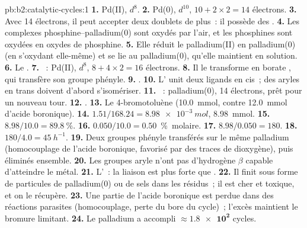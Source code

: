 \begin{solution}{pb:b2:catalytic-cycles:1}
\textbf{1.} Pd(II), $d^8$.
\textbf{2.} Pd(0), $d^{10}$, $10 + 2 \times 2 = 14$ électrons.
\textbf{3.} Avec 14 électrons, il peut accepter deux doublets de plus~: il possède des .
\textbf{4.} Les complexes phosphine--palladium(0) sont oxydés par l'air, et les phosphines sont
oxydées en oxydes de phosphine.
\textbf{5.} Elle réduit le palladium(II) en palladium(0) (en s'oxydant elle-même) et se lie au
palladium(0), qu'elle maintient en solution.
\textbf{6.} Le .
\textbf{7.} ~: Pd(II), $d^8$, $8 + 4 \times 2 =
16$ électrons.
\textbf{8.} Il le transforme en borate , qui transfère son groupe phényle.
\textbf{9.} .
\textbf{10.} L' unit deux ligands en cis~; des aryles en trans doivent d'abord s'isomériser.
\textbf{11.} ~: palladium(0), 14 électrons, prêt
pour un nouveau tour.
\textbf{12.} .
\textbf{13.} Le 4-bromotoluène (\qty{10.0}{mmol}, contre \qty{12.0}{mmol} d'acide boronique).
\textbf{14.} $1.51/168.24 = \qty{8.98e-3}{mol}$, \qty{8.98}{mmol}.
\textbf{15.} $8.98/10.0 = 89.8~\%$.
\textbf{16.} $0.050/10.0 = 0.50$~\%~molaire.
\textbf{17.} $8.98/0.050 = 180$.
\textbf{18.} $180/4.0 = \qty{45}{h^{-1}}$.
\textbf{19.} Deux groupes phényle transférés sur le même palladium (homocouplage de
l'acide boronique, favorisé par des traces de dioxygène), puis éliminés ensemble.
\textbf{20.} Les groupes aryle n'ont pas d'hydrogène $\beta$ capable d'atteindre le métal.
\textbf{21.} L'~: la liaison  est plus forte que .
\textbf{22.} Il finit sous forme de particules de palladium(0) ou de sels dans les résidus~; il est cher et
toxique, et on le récupère.
\textbf{23.} Une partie de l'acide boronique est perdue dans des réactions parasites (homocouplage, perte du bore
du cycle)~; l'excès maintient le bromure limitant.
\textbf{24.} Le palladium a accompli $\boldsymbol{\approx \num{1.8e2}}$ cycles.
\end{solution}
